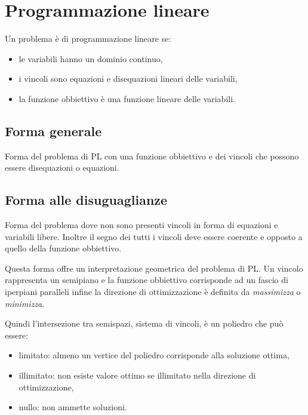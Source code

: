 \chapter{Programmazione lineare}

Un problema è di programmazione lineare se:

\begin{itemize}
    \item le variabili hanno un dominio continuo,
    \item i vincoli sono equazioni e disequazioni lineari delle variabili,
    \item la funzione obbiettivo è una funzione lineare delle variabili.
\end{itemize}

\section{Forma generale}
Forma del problema di PL con una funzione obbiettivo e dei vincoli che possono essere disequazioni o equazioni. 

\section{Forma alle disuguaglianze}
Forma del problema dove non sono presenti vincoli in forma di equazioni e variabili libere. Inoltre il segno dei tutti i vincoli deve essere coerente e opposto a quello della funzione obbiettivo.


Questa forma offre un interpretazione geometrica del problema di PL. Un vincolo rappresenta un semipiano e la funzione obbiettivo corrisponde ad un fascio di iperpiani paralleli infine la direzione di ottimizzazione è definita da \textit{massimizza} o \textit{minimizza}.

Quindi l'intersezione tra semispazi, sistema di vincoli, è un poliedro che può essere: 
\begin{itemize}
    \item limitato: almeno un vertice del poliedro corrisponde alla soluzione ottima,
    \item illimitato: non esiste valore ottimo se illimitato nella direzione di ottimizzazione,
    \item nullo: non ammette soluzioni.
\end{itemize}

